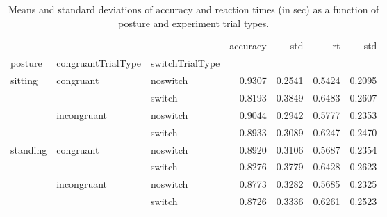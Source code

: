 \begin{table}
\centering
\caption{Means and standard deviations of accuracy and reaction times (in sec) as a function of posture and experiment trial types.}
\label{table-task-switching-replication-reaction-time}
\begin{tabular}{lllrrrr}
\toprule
         &             &        & accuracy &    std &     rt &    std \\
posture & congruantTrialType & switchTrialType &          &        &        &        \\
\midrule
sitting & congruant & noswitch &   0.9307 & 0.2541 & 0.5424 & 0.2095 \\
         &             & switch &   0.8193 & 0.3849 & 0.6483 & 0.2607 \\
         & incongruant & noswitch &   0.9044 & 0.2942 & 0.5777 & 0.2353 \\
         &             & switch &   0.8933 & 0.3089 & 0.6247 & 0.2470 \\
standing & congruant & noswitch &   0.8920 & 0.3106 & 0.5687 & 0.2354 \\
         &             & switch &   0.8276 & 0.3779 & 0.6428 & 0.2623 \\
         & incongruant & noswitch &   0.8773 & 0.3282 & 0.5685 & 0.2325 \\
         &             & switch &   0.8726 & 0.3336 & 0.6261 & 0.2523 \\
\bottomrule
\end{tabular}
\end{table}

